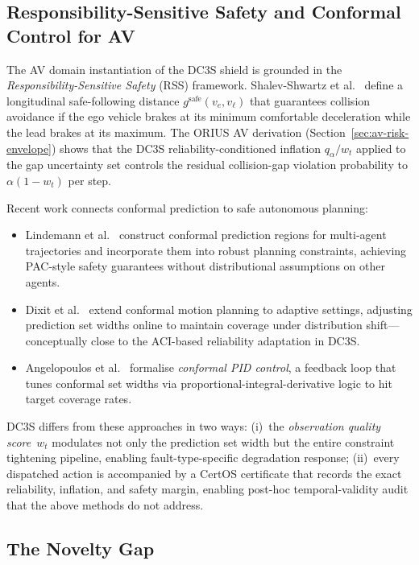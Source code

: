 \subsection{Responsibility-Sensitive Safety and Conformal Control for AV}

The AV domain instantiation of the DC3S shield is grounded in the
\emph{Responsibility-Sensitive Safety} (RSS) framework.  Shalev-Shwartz
et al.~\cite{shalev2017formal} define a longitudinal safe-following distance
$g^{\text{safe}}(v_e, v_\ell)$ that guarantees collision avoidance if the ego
vehicle brakes at its minimum comfortable deceleration while the lead brakes
at its maximum.  The ORIUS AV derivation
(Section~\ref{sec:av-risk-envelope}) shows that the DC3S reliability-conditioned
inflation $q_\alpha / w_t$ applied to the gap uncertainty set controls the
residual collision-gap violation probability to $\alpha(1 - w_t)$ per step.

Recent work connects conformal prediction to safe autonomous planning:
\begin{itemize}
  \item Lindemann et al.~\cite{lindemann2023conformal} construct conformal
    prediction regions for multi-agent trajectories and incorporate them into
    robust planning constraints, achieving PAC-style safety guarantees without
    distributional assumptions on other agents.
  \item Dixit et al.~\cite{dixit2023adaptive} extend conformal motion planning
    to adaptive settings, adjusting prediction set widths online to maintain
    coverage under distribution shift---conceptually close to the ACI-based
    reliability adaptation in DC3S.
  \item Angelopoulos et al.~\cite{angelopoulos2023conformal} formalise
    \emph{conformal PID control}, a feedback loop that tunes conformal set
    widths via proportional-integral-derivative logic to hit target coverage
    rates.
\end{itemize}

DC3S differs from these approaches in two ways: (i)~the \emph{observation
quality score}~$w_t$ modulates not only the prediction set width but the
entire constraint tightening pipeline, enabling fault-type-specific
degradation response; (ii)~every dispatched action is accompanied by a
CertOS certificate that records the exact reliability, inflation, and safety
margin, enabling post-hoc temporal-validity audit that the above methods
do not address.

\subsection{The Novelty Gap}

